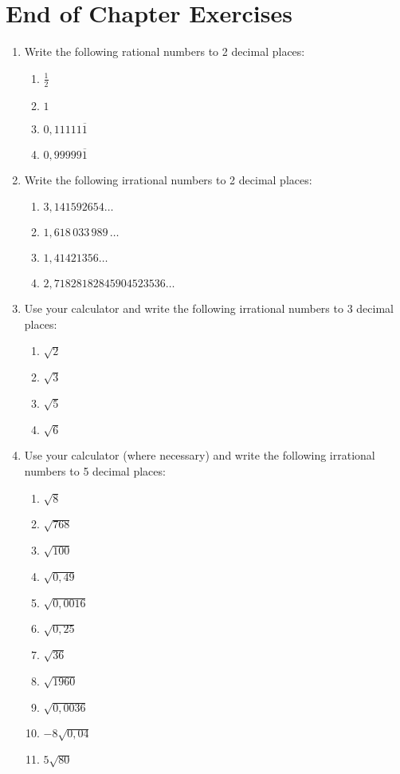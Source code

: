 \documentclass[10pt,a4paper,titlepage,twoside,openright]{report}
\begin{document}
\section{End of Chapter Exercises}
\begin{enumerate}
\item{Write the following rational numbers to 2 decimal places:
\begin{enumerate}
\item{$\frac{1}{2}$}
\item{$1$}
\item{$0,11111\overline{1}$}
\item{$0,99999\overline{1}$}
\end{enumerate}
}
\item{Write the following irrational numbers to 2 decimal places:
\begin{enumerate}
\item{$3,141592654\ldots$}
\item{$1,618\,033\,989\,\ldots$}
\item{$1,41421356\ldots$}
\item{$2,71828 18284 59045 23536\ldots$}
\end{enumerate}
}
\item{Use your calculator and write the following irrational numbers to 3 decimal places:
\begin{enumerate}
\item{$\sqrt{2}$}
\item{$\sqrt{3}$}
\item{$\sqrt{5}$}
\item{$\sqrt{6}$}
\end{enumerate}}
\item{Use your calculator (where necessary) and write the following irrational numbers to 5 decimal places:
\begin{enumerate}
\item $\sqrt 8$
\item $\sqrt {768}$
\item $\sqrt {100}$
\item $\sqrt {0,49}$
\item $\sqrt {0,0016}$
\item $\sqrt {0,25}$
\item $\sqrt {36}$
\item $\sqrt {1960}$
\item $\sqrt {0,0036}$
\item $-8\sqrt {0,04}$
\item $5\sqrt {80}$
\end{enumerate}
}
\end{enumerate}
\end{document}
